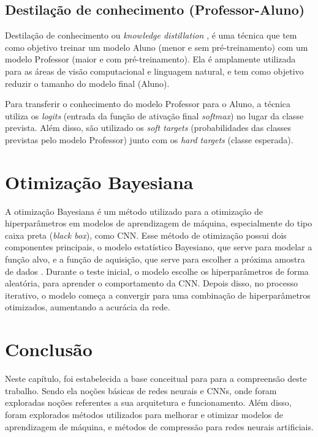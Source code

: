 \subsection{Destilação de conhecimento (Professor-Aluno)}\label{conceitos_destilacao}

Destilação de conhecimento ou \textit{knowledge distillation} \cite{hinton2015distilling}, é uma técnica que tem
como objetivo treinar um modelo Aluno (menor e sem pré-treinamento) com um modelo Professor
(maior e com pré-treinamento). Ela é amplamente utilizada para as áreas de visão computacional e linguagem natural,
e tem como objetivo reduzir o tamanho do modelo final (Aluno).

Para transferir o conhecimento do modelo Professor para o Aluno, a técnica utiliza os \textit{logits} (entrada da
função de ativação final \textit{softmax}) no lugar da classe prevista. Além disso, são utilizado os
\textit{soft targets} (probabilidades das classes previstas pelo modelo Professor) junto com os
\textit{hard targets} (classe esperada).


\section{Otimização Bayesiana}\label{cap_conceitos_bayesiana}
A otimização Bayesiana é um método utilizado para a otimização de hiperparâmetros em modelos de aprendizagem de
máquina, especialmente do tipo caixa preta (\textit{black box}), como CNN.
Esse método de otimização possui dois componentes principais, o modelo estatístico Bayesiano, que serve para modelar a
função alvo, e a função de aquisição, que serve para escolher a próxima amostra de dados \cite{frazier2018tutorial}.
Durante o teste inicial, o modelo escolhe os hiperparâmetros de forma aleatória, para aprender o comportamento da CNN.
Depois disso, no processo iterativo, o modelo começa a convergir para uma combinação de hiperparâmetros otimizados,
aumentando a acurácia da rede.



\section{Conclusão}
Neste capítulo, foi estabelecida a base conceitual para para a compreensão deste trabalho.
Sendo ela noções básicas de redes neurais e CNNs, onde foram exploradas noções referentes a sua arquitetura e funcionamento.
Além disso, foram explorados métodos utilizados para melhorar e otimizar modelos de aprendizagem de máquina, e métodos de
compressão para redes neurais artificiais.
